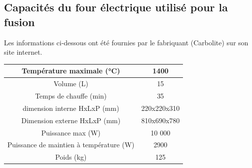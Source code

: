 \documentclass{article}
\begin{document}
\subsection{Capacités du four électrique utilisé pour la fusion}

Les informations ci-dessous ont été fournies par le fabriquant (Carbolite) sur son site internet.

\begin{tabular}{|c|c|}
\hline
Température maximale (°C) & 1400  \\
\hline
Volume (L) & 15 \\
\hline
Temps de chauffe (min) & 35 \\
\hline
dimension interne HxLxP (mm) & 220x220x310 \\
\hline
Dimension externe HxLxP (mm) & 810x690x780 \\
\hline
Puissance max (W) & 10 000 \\
\hline
Puissance de maintien à température (W) & 2900 \\
\hline
Poids (kg) & 125 \\
\hline
\end{tabular} 
\end{document}
